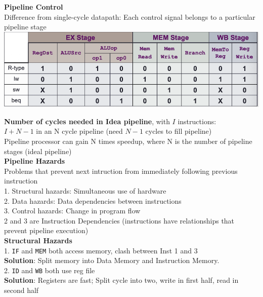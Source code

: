 \documentclass[10pt, a4paper]{article}
\newcommand{\highlight}[1]{{\color{red}\textbf{#1}}}
\begin{document}
\begin{multicols*}{3}
		\textbf{Pipeline Control}\\
		Difference from single-cycle datapath: Each control signal belongs to a particular pipeline stage\\
		\includegraphics[scale=.5]{./assets/groupedControls}
		
		\highlight{Number of cycles needed in Idea pipeline}, with $I$ instructions:\\
		$I + N - 1$ in an N cycle pipeline (need $N-1$ cycles to fill pipeline)\\ 

		Pipeline processor can gain N times speedup, where N is the number of pipeline stages (ideal pipeline)\\
		
		{\normalsize\textbf{Pipeline Hazards}}\\
		Problems that prevent next intruction from immediately following previous instruction\\
		1. Structural hazards: Simultaneous use of hardware\\
		2. Data hazards: Data dependencies between instructions\\
		3. Control hazards: Change in program flow\\
		2 and 3 are Instruction Dependencies (instructions have relationships that prevent pipeline execution)\\
		
		\textbf{Structural Hazards}\\
		1. \texttt{IF} and \texttt{MEM} both access memory, clash between Inst 1 and 3\\
		\highlight{Solution}: Split memory into Data Memory and Instruction Memory.\\
		
		2. \texttt{ID} and \texttt{WB} both use reg file\\
		\highlight{Solution}: Registers are fast; Split cycle into two, write in first half, read in second half\\
		

\end{multicols*}
\end{document}
